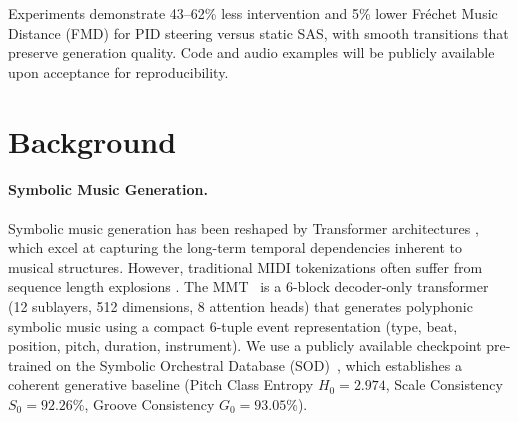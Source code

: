\documentclass{article}
\theoremstyle{plain}
\begin{document}
Experiments demonstrate 43--62\% less intervention and 5\% lower Fr\'{e}chet Music Distance (FMD) for PID steering versus static SAS, with smooth transitions that preserve generation quality. Code and audio examples will be publicly available upon acceptance for reproducibility.

\section{Background}
\label{sec:background}

\paragraph{Symbolic Music Generation.}
Symbolic music generation has been reshaped by Transformer architectures \cite{vaswani2017attention}, which excel at capturing the long-term temporal dependencies inherent to musical structures. However, traditional MIDI tokenizations often suffer from sequence length explosions \cite{fradet2023miditok}. The MMT~\cite{dong2023multitrack} is a 6-block decoder-only transformer (12 sublayers, 512 dimensions, 8 attention heads) that generates polyphonic symbolic music using a compact 6-tuple event representation (type, beat, position, pitch, duration, instrument). We use a publicly available checkpoint pre-trained on the Symbolic Orchestral Database (SOD)~\cite{crestel2018sod}, which establishes a coherent generative baseline (Pitch Class Entropy $H_0{=}2.974$, Scale Consistency $S_0{=}92.26\%$, Groove Consistency $G_0{=}93.05\%$).
\end{document}

